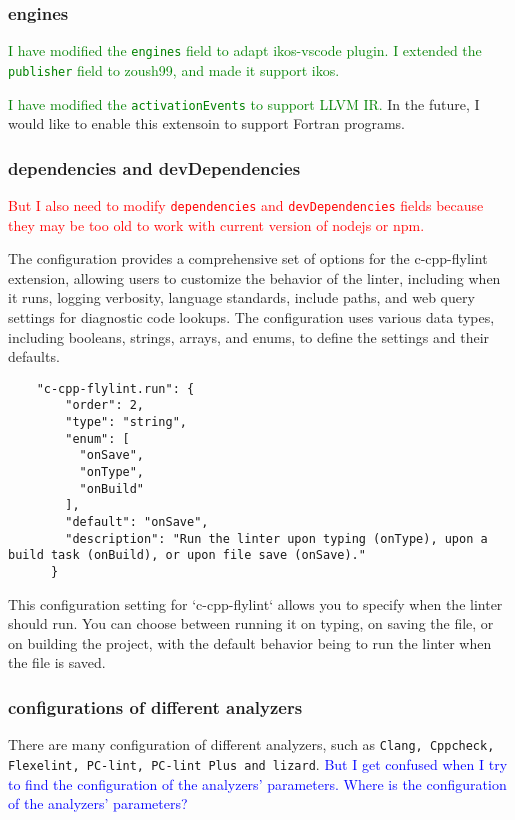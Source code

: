 \documentclass[12pt]{article}
\begin{document}
\subsubsection{engines}
\textcolor{green}{I have modified the \texttt{engines} field to adapt ikos-vscode plugin. I extended the \texttt{publisher} field to zoush99, and made it support ikos.}

\textcolor{green}{I have modified the \texttt{activationEvents} to support LLVM IR.} In the future, I would like to enable this extensoin to support Fortran programs.

\subsubsection{dependencies and devDependencies}
\textcolor{red}{But I also need to modify \texttt{dependencies} and \texttt{devDependencies} fields because they may be too old to work with current version of nodejs or npm.}

The configuration provides a comprehensive set of options for the c-cpp-flylint extension, allowing users to customize the behavior of the linter, including when it runs, logging verbosity, language standards, include paths, and web query settings for diagnostic code lookups. The configuration uses various data types, including booleans, strings, arrays, and enums, to define the settings and their defaults.

\begin{lstlisting}
    "c-cpp-flylint.run": {
        "order": 2,
        "type": "string",
        "enum": [
          "onSave",
          "onType",
          "onBuild"
        ],
        "default": "onSave",
        "description": "Run the linter upon typing (onType), upon a build task (onBuild), or upon file save (onSave)."
      }
\end{lstlisting}

This configuration setting for `c-cpp-flylint` allows you to specify when the linter should run. You can choose between running it on typing, on saving the file, or on building the project, with the default behavior being to run the linter when the file is saved.

\subsubsection{configurations of different analyzers}
There are many configuration of different analyzers, such as \texttt{Clang, Cppcheck, Flexelint, PC-lint, PC-lint Plus and lizard}. \textcolor{blue}{But I get confused when I try to find the configuration of the analyzers' parameters. Where is the configuration of the analyzers' parameters?}
\end{document}
